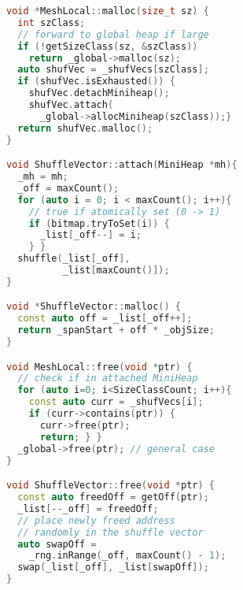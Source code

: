 \begin{lstlisting}[language=C++]
void *MeshLocal::malloc(size_t sz) {
  int szClass;
  // forward to global heap if large
  if (!getSizeClass(sz, &szClass))
    return _global->malloc(sz);
  auto shufVec = _shufVecs[szClass];
  if (shufVec.isExhausted()) {
    shufVec.detachMiniheap();
    shufVec.attach(
      _global->allocMiniheap(szClass));}
  return shufVec.malloc();
}

void ShuffleVector::attach(MiniHeap *mh){
  _mh = mh;
  _off = maxCount();
  for (auto i = 0; i < maxCount(); i++){
    // true if atomically set (0 -> 1)
    if (bitmap.tryToSet(i)) {
      _list[_off--] = i;
    } }
  shuffle(_list[_off],
          _list[maxCount()]);
}

void *ShuffleVector::malloc() {
  const auto off = _list[_off++];
  return _spanStart + off * _objSize;
}

void MeshLocal::free(void *ptr) {
  // check if in attached MiniHeap
  for (auto i=0; i<SizeClassCount; i++){
    const auto curr = _shufVecs[i];
    if (curr->contains(ptr)) {
      curr->free(ptr);
      return; } }
  _global->free(ptr); // general case
}

void ShuffleVector::free(void *ptr) {
  const auto freedOff = getOff(ptr);
  _list[--_off] = freedOff;
  // place newly freed address
  // randomly in the shuffle vector
  auto swapOff =
    _rng.inRange(_off, maxCount() - 1);
  swap(_list[_off], _list[swapOff]);
}
\end{lstlisting}
